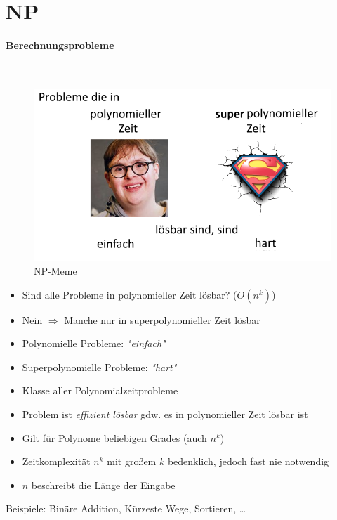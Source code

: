 \documentclass[
    ngerman,
    color=3b,
    dark_mode,
    load_common, %
    summary,
    boxarc,
]{rubos-tuda-template}
\begin{document}
\section{NP}
\paragraph{Berechnungsprobleme}\mbox{}\vspace{-2em}\\
\begin{figure}
      \includegraphics[width=.35\textwidth]{pictures/npmeme.png}
      \caption{NP-Meme}
\end{figure}
\begin{itemize}
      \item Sind alle Probleme in polynomieller Zeit lösbar? ($O(n^k)$)
      \item Nein $\Rightarrow$ Manche nur in superpolynomieller Zeit lösbar
      \item Polynomielle Probleme: \textit{\string"einfach\string"}
      \item Superpolynomielle Probleme: \textit{\string"hart\string"}
\end{itemize}
\mbox{}\vspace{1cm}

\begin{definition}[Klasse P]\mbox{}
      \begin{itemize}
            \item Klasse aller Polynomialzeitprobleme
            \item Problem ist \textit{effizient lösbar} gdw. es in polynomieller Zeit lösbar ist
            \item Gilt für Polynome beliebigen Grades (auch $n^k$)
            \item Zeitkomplexität $n^k$ mit gro\ss em $k$ bedenklich, jedoch fast nie notwendig
            \item $n$ beschreibt die Länge der Eingabe
      \end{itemize}
\end{definition}
Beispiele: Binäre Addition, Kürzeste Wege, Sortieren, \dots
\end{document}
